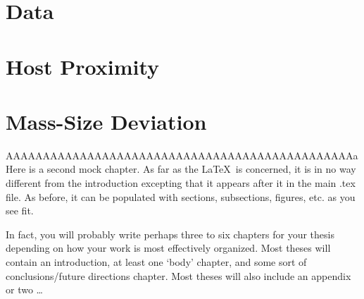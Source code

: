 
\section{Data} 

\section{Host Proximity}

\section{Mass-Size Deviation}







AAAAAAAAAAAAAAAAAAAAAAAAAAAAAAAAAAAAAAAAAAAAAAAa
Here is a second mock chapter.  As far as the \LaTeX ~is concerned, it is in no way different from the introduction excepting that it appears after it in the main .tex file.  As before, it can be populated with sections, subsections, figures, etc. as you see fit.

In fact, you will probably write perhaps three to six chapters for your thesis depending on how your work is most effectively organized.  Most theses will contain an introduction, at least one `body' chapter, and some sort of conclusions/future directions chapter.  Most theses will also include an appendix or two \ldots